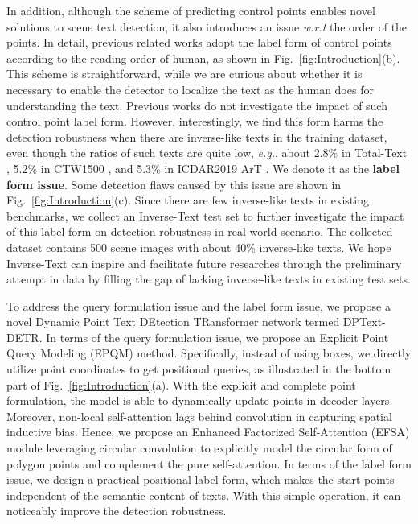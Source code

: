 \documentclass[letterpaper]{article} \usepackage{aaai23}  \usepackage{times}  \usepackage{helvet}  \usepackage{courier}  \usepackage[hyphens]{url}  \usepackage{graphicx} \urlstyle{rm}
\begin{document}
In addition, although the scheme of predicting control points enables novel solutions to scene text detection, it also introduces an issue \emph{w.r.t} the order of the points. 
In detail, previous related works adopt the label form of control points according to the reading order of human, as shown in Fig.~\ref{fig:Introduction}(b). This scheme is straightforward, while we are curious about whether it is necessary to enable the detector to localize the text as the human does for understanding the text. Previous works do not investigate the impact of such control point label form. However, interestingly, we find this form harms the detection robustness when there are inverse-like texts in the training dataset, even though the ratios of such texts are quite low, \emph{e.g.}, about 2.8$\%$ in Total-Text \cite{ch2020total}, 5.2$\%$ in CTW1500 \cite{liu2019curved}, and 5.3$\%$ in ICDAR2019 ArT \cite{chng2019icdar2019}.  We denote it as the \textbf{label form issue}.
Some detection flaws caused by this issue are shown in Fig.~\ref{fig:Introduction}(c). 
Since there are few inverse-like texts in existing benchmarks, we collect an Inverse-Text test set to further investigate the impact of this label form on detection robustness in real-world scenario. The collected dataset contains 500 scene images with about 40$\%$ inverse-like texts. We hope Inverse-Text can inspire and facilitate future researches through the preliminary attempt in data by filling the gap of lacking inverse-like texts in existing test sets.

To address the query formulation issue and the label form issue, we propose a novel Dynamic Point Text DEtection TRansformer network termed DPText-DETR. In terms of the query formulation issue, we propose an Explicit Point Query Modeling (EPQM) method. Specifically, instead of using boxes, we directly utilize point coordinates to get positional queries, as illustrated in the bottom part of Fig.~\ref{fig:Introduction}(a). With the explicit and complete point formulation, the model is able to dynamically update points in decoder layers. 
Moreover, non-local self-attention lags behind convolution in capturing spatial inductive bias. Hence, we propose an Enhanced Factorized Self-Attention (EFSA) module leveraging circular convolution \cite{peng2020deep} to explicitly model the circular form of polygon points and complement the pure self-attention.
In terms of the label form issue, we design a practical positional label form, which makes the start points independent of the semantic content of texts. With this simple operation, it can noticeably improve the detection robustness.
\end{document}
